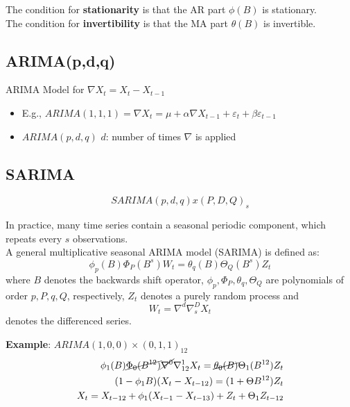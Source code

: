 The condition for \textbf{stationarity} is that the AR part $\phi(B)$ is stationary.\\
The condition for \textbf{invertibility} is that the MA part $\theta(B)$ is invertible.

\subsection{ARIMA(p,d,q)}

ARIMA Model for \(\nabla X_t=X_t-X_{t-1}\)
\begin{itemize}
    \item[] E.g., \( ARIMA(1,1,1)=\nabla X_t=\mu +\alpha \nabla X_{t-1} + \varepsilon_t + \beta \varepsilon_{t-1} \)
    \item $ARIMA(p,d,q)$ \quad $d$: number of times $\nabla$ is applied
\end{itemize}

\subsection{SARIMA}

\[SARIMA(p,d,q) x (P,D,Q)_s\]

In practice, many time series contain a seasonal periodic component, which repeats every $s$ observations. \\

A general multiplicative seasonal ARIMA model (SARIMA) is defined as: \[
\phi_p(B) \Phi_P(B^s)W_t = \theta_q(B)\Theta_Q(B^s)Z_t 
\]
where $B$ denotes the backwards shift operator, $\phi_p, \Phi_P, \theta_q, \Theta_Q$ are polynomials of order $p,P,q,Q$, respectively, $Z_t$ denotes a purely random process and \[ W_t=\nabla^d \nabla^D_s X_t \] denotes the differenced series.

\textbf{Example}: $ARIMA(1,0,0)\times(0,1,1)_12$
\begin{align*}
    \phi_1(B) \cancel{\Phi_0(B^{12})} \cancel{\nabla^0} \nabla^1_{12} X_t = \cancel{\theta_0(B)}\Theta_1(B^{12})Z_t \\
    (1-\phi_1 B)(X_t-X_{t-12})=(1+\Theta B^{12})Z_t \\
    X_t = X_{t-12} + \phi_1(X_{t-1}-X_{t-13}) + Z_t + \Theta_1 Z_{t-12}
\end{align*}

